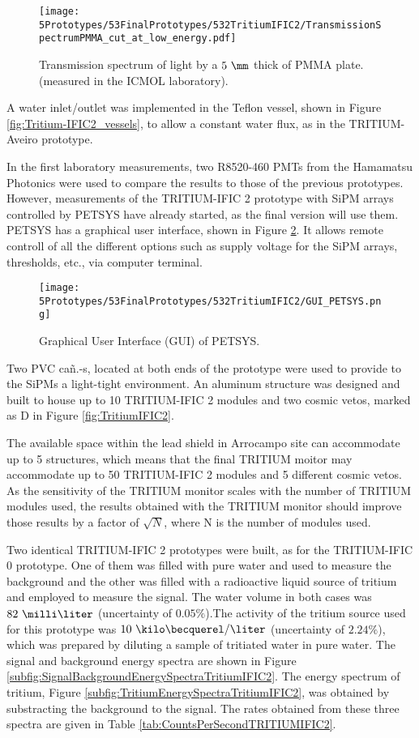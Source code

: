 \begin{figure}[h]
\centering
\texttt{[image: 5Prototypes/53FinalPrototypes/532TritiumIFIC2/TransmissionSpectrumPMMA\_cut\_at\_low\_energy.pdf]}
\caption{Transmission spectrum of light by a $5~\mm$ thick of PMMA plate. (measured in the ICMOL laboratory). \label{fig:PMMATransmissionSpectrum}}
\end{figure}	

A water inlet/outlet was implemented in the Teflon vessel, shown in Figure \ref{fig:Tritium-IFIC2_vessels}, to allow a constant water flux, as in the TRITIUM-Aveiro prototype.

In the first laboratory measurements, two R8520-460 PMTs from the Hamamatsu Photonics \cite{DataSheetPMTs} were used to compare the results to those of the previous prototypes. However, measurements of the TRITIUM-IFIC 2 prototype with SiPM arrays controlled by PETSYS have already started, as the final version will use them. PETSYS has a graphical user interface, shown in Figure \ref{fig:GUI_PETSYS}. It allows remote controll of all the different options such as supply voltage for the SiPM arrays, thresholds, etc., via computer terminal. 

\begin{figure}[h]
\centering
\texttt{[image: 5Prototypes/53FinalPrototypes/532TritiumIFIC2/GUI\_PETSYS.png]}
\caption{Graphical User Interface (GUI) of PETSYS.\label{fig:GUI_PETSYS}}
\end{figure}

Two PVC cañ.-s, located at both ends of the prototype were used to provide to the SiPMs a light-tight environment. An aluminum structure was designed and built to house up to 10 TRITIUM-IFIC 2 modules and two cosmic vetos, marked as D in Figure \ref{fig:TritiumIFIC2}.

The available space within the lead shield in Arrocampo site can accommodate up to 5 structures, which means that the final TRITIUM moitor may accommodate up to 50 TRITIUM-IFIC 2 modules and 5 different cosmic vetos. As the sensitivity of the TRITIUM monitor scales with the number of TRITIUM modules used, the results obtained with the TRITIUM monitor should improve those results by a factor of $\sqrt{N}$, where N is the number of modules used.

Two identical TRITIUM-IFIC 2 prototypes were built, as for the TRITIUM-IFIC 0 prototype. One of them was filled with pure water and used to measure the background and the other was filled with a radioactive liquid source of tritium and employed to measure the signal. The water volume in both cases was $82~\milli\liter$ (uncertainty of $0.05\%$).The activity of the tritium source used for this prototype was $10~\kilo\becquerel/\liter$ (uncertainty of $2.24\%$), which was prepared by diluting a sample of tritiated water in pure water. The signal and background energy spectra are shown in Figure \ref{subfig:SignalBackgroundEnergySpectraTritiumIFIC2}. The energy spectrum of tritium, Figure \ref{subfig:TritiumEnergySpectraTritiumIFIC2}, was obtained by substracting the background to the signal. The rates obtained from these three spectra are given in Table \ref{tab:CountsPerSecondTRITIUMIFIC2}. 

